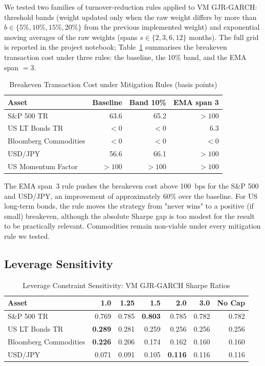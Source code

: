 \documentclass[12pt, a4paper]{article}
\begin{document}
We tested two families of turnover-reduction rules applied to VM GJR-GARCH: threshold bands
(weight updated only when the raw weight differs by more than $b\in\{5\%,10\%,15\%,20\%\}$
from the previous implemented weight) and exponential moving averages of the raw weights
(spans $s\in\{2,3,6,12\}$ months). The full grid is reported in the project notebook;
Table~\ref{tab:tc-mit} summarises the breakeven transaction cost under three rules: the
baseline, the 10\% band, and the EMA span $=3$.

\begin{table}[H]
\centering
\small
\caption{Breakeven Transaction Cost under Mitigation Rules (basis points)}
\label{tab:tc-mit}
\begin{tabular}{lrrr}
\toprule
\textbf{Asset} & \textbf{Baseline} & \textbf{Band 10\%} & \textbf{EMA span 3}\\
\midrule
S\&P 500 TR              & 63.6 & 65.2  & $>100$\\
US LT Bonds TR           & $<0$ & $<0$  & 6.3\\
Bloomberg Commodities    & $<0$ & $<0$  & $<0$\\
USD/JPY                  & 56.6 & 66.1  & $>100$\\
US Momentum Factor       & $>100$ & $>100$ & $>100$\\
\bottomrule
\end{tabular}
\end{table}

\noindent The EMA span~3 rule pushes the breakeven cost above 100~bps for the S\&P 500 and
USD/JPY, an improvement of approximately 60\% over the baseline. For US long-term bonds,
the rule moves the strategy from "never wins" to a positive (if small) breakeven, although
the absolute Sharpe gap is too modest for the result to be practically relevant.
Commodities remain non-viable under every mitigation rule we tested.

\subsection{Leverage Sensitivity}

\begin{table}[H]
\centering
\small
\caption{Leverage Constraint Sensitivity: VM GJR-GARCH Sharpe Ratios}
\label{tab:lev}
\begin{tabular}{lrrrrrr}
\toprule
\textbf{Asset} & \textbf{1.0} & \textbf{1.25} & \textbf{1.5} & \textbf{2.0} & \textbf{3.0} & \textbf{No Cap}\\
\midrule
S\&P 500 TR              & 0.769 & 0.785 & \textbf{0.803} & 0.785 & 0.782 & 0.782\\
US LT Bonds TR           & \textbf{0.289} & 0.281 & 0.259 & 0.256 & 0.256 & 0.256\\
Bloomberg Commodities    & \textbf{0.226} & 0.206 & 0.174 & 0.162 & 0.160 & 0.160\\
USD/JPY                  & 0.071 & 0.091 & 0.105 & \textbf{0.116} & 0.116 & 0.116\\
\bottomrule
\end{tabular}
\end{table}
\end{document}
